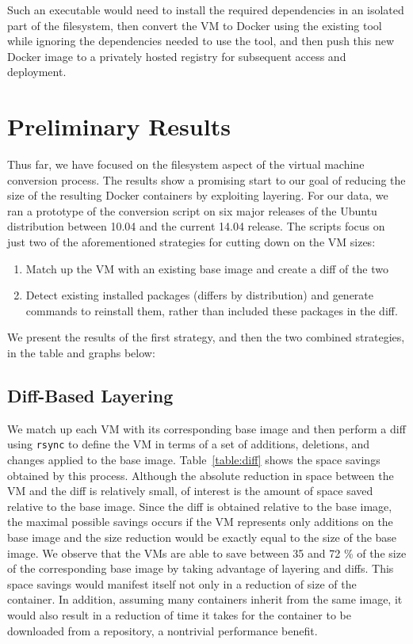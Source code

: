 \documentclass[\myfontsize, letterpaper]{article}
\begin{document}
Such an executable would need to install the required dependencies in an isolated part of the filesystem, then convert the VM to Docker using the existing tool while ignoring the dependencies needed to use the tool, and then push this new Docker image to a privately hosted registry for subsequent access and deployment.

\section{Preliminary Results}
\label{sec:results}
Thus far, we have focused on the filesystem aspect of the virtual machine conversion process. The results show a promising start to our goal of reducing the size of the resulting Docker containers by exploiting layering. For our data, we ran a prototype of the conversion script on six major releases of the Ubuntu distribution between 10.04 and the current 14.04 release. The scripts focus on just two of the aforementioned strategies for cutting down on the VM sizes:

\begin{enumerate}
\item Match up the VM with an existing base image and create a diff of the two
\item Detect existing installed packages (differs by distribution) and generate commands to reinstall them, rather than included these packages in the diff.
\end{enumerate}

We present the results of the first strategy, and then the two combined strategies, in the table and graphs below:

\subsection{Diff-Based Layering}
We match up each VM with its corresponding base image and then perform a diff using \texttt{rsync} to define the VM in terms of a set of additions, deletions, and changes applied to the base image. Table~\ref{table:diff} shows the space savings obtained by this process. Although the absolute reduction in space between the VM and the diff is relatively small, of interest is the amount of space saved relative to the base image. Since the diff is obtained relative to the base image, the maximal possible savings occurs if the VM represents only additions on the base image and the size reduction would be exactly equal to the size of the base image. We observe that the VMs are able to save between 35 and 72 \% of the size of the corresponding base image by taking advantage of layering and diffs. This space savings would manifest itself not only in a reduction of size of the container. In addition, assuming many containers inherit from the same image, it would also result in a reduction of time it takes for the container to be downloaded from a repository, a nontrivial performance benefit.
\end{document}
